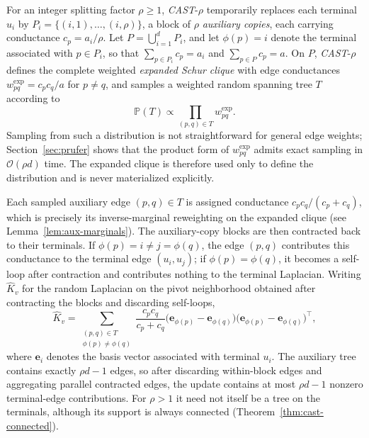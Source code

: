 \documentclass{article}
\newcommand{\CAST}{\textit{CAST}\xspace}
\newcommand{\calO}{\mathcal{O}}
\newcommand{\bigO}{\calO}
\newcommand{\1}{\mathbbm{1}}
\theoremstyle{plain}
\begin{document}
For an integer splitting factor $\rho\geq 1$, \CAST-$\rho$ temporarily
replaces each terminal $u_i$ by $P_i=\{(i,1),\ldots,(i,\rho)\}$, a block of $\rho$ \emph{auxiliary
copies}, each carrying conductance
$c_p=a_i/\rho$. Let $P=\bigcup_{i=1}^{d}P_i$, and let $\phi(p)=i$
denote the terminal associated with $p\in P_i$, so that
$\sum_{p\in P_i}c_p=a_i$ and $\sum_{p\in P}c_p=a$. On $P$,
\CAST-$\rho$ defines the complete weighted \emph{expanded Schur clique}
with edge conductances $w^{\mathrm{exp}}_{pq}=c_pc_q/a$ for $p\neq q$,
and samples a weighted random spanning tree $T$ according to
\begin{equation}
\label{eqn:expanded-wrst}
    \mathbb{P}(T)\propto \prod_{(p,q)\in T}w_{pq}^{\mathrm{exp}}.
\end{equation}
Sampling from such a distribution is not straightforward for general
edge weights; Section~\ref{sec:prufer} shows that the product form of
$w^{\mathrm{exp}}_{pq}$ admits exact sampling in $\bigO(\rho d)$ time.
The expanded clique is therefore used only to define the distribution
and is never materialized explicitly.

Each sampled auxiliary edge $(p,q)\in T$ is assigned conductance
$c_pc_q/(c_p+c_q)$, which is precisely its inverse-marginal reweighting
on the expanded clique (see Lemma~\ref{lem:aux-marginals}). The
auxiliary-copy blocks are then contracted back to their terminals. If
$\phi(p)=i\neq j=\phi(q)$, the edge $(p,q)$ contributes this
conductance to the terminal edge $(u_i,u_j)$; if $\phi(p)=\phi(q)$, it
becomes a self-loop after contraction and contributes nothing to the
terminal Laplacian. Writing $\widehat K_v$ for the random Laplacian on
the pivot neighborhood obtained after contracting the blocks and
discarding self-loops,
\begin{equation}
\label{eqn:cast-update}
\widehat K_v = \sum_{\substack{(p,q)\in T\\ \phi(p)\neq\phi(q)}}
\frac{c_pc_q}{c_p+c_q}
\bigl(\mathbf e_{\phi(p)}-\mathbf e_{\phi(q)}\bigr)
\bigl(\mathbf e_{\phi(p)}-\mathbf e_{\phi(q)}\bigr)^\top,
\end{equation}
where $\mathbf e_i$ denotes the basis vector associated with terminal
$u_i$. The auxiliary tree contains exactly $\rho d-1$ edges, so after
discarding within-block edges and aggregating parallel contracted
edges, the update contains at most $\rho d-1$ nonzero terminal-edge
contributions. For $\rho>1$ it need not itself be a tree on the
terminals, although its support is always connected (Theorem~\ref{thm:cast-connected}).
\end{document}

